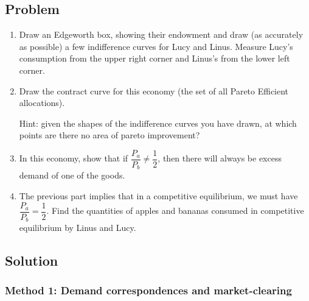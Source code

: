 \documentclass[12pt]{article}
\begin{document}
\subsection{Problem}
\begin{enumerate}[label=(\alph*)]
    \item Draw an Edgeworth box, showing their endowment and draw (as accurately as possible) a few indifference curves for Lucy and Linus. Measure Lucy's consumption from the upper right corner and Linus's from the lower left corner.
    \item Draw the contract curve for this economy (the set of all Pareto Efficient allocations).

    Hint: given the shapes of the indifference curves you have drawn, at which points are there no area of pareto improvement?
    \item In this economy, show that if \(\dfrac{P_a}{P_b}\neq \dfrac12\), then there will always be excess demand of one of the goods.
    \item The previous part implies that in a competitive equilibrium, we must have \(\dfrac{P_a}{P_b}=\dfrac12\). Find the quantities of apples and bananas consumed in competitive equilibrium by Linus and Lucy.
\end{enumerate}

\newpage
\subsection{Solution}

\subsubsection{Method 1: Demand correspondences and market-clearing}
\end{document}
